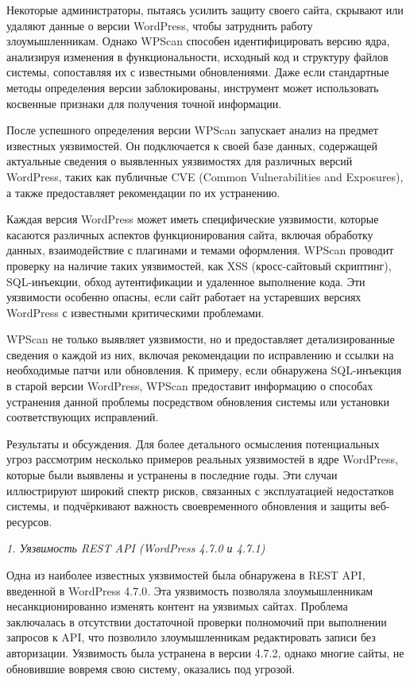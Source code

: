 \begin{multicols}{2}
Некоторые администраторы, пытаясь усилить защиту своего сайта, скрывают
или удаляют данные о версии WordPress, чтобы затруднить работу
злоумышленникам. Однако WPScan способен идентифицировать версию ядра,
анализируя изменения в функциональности, исходный код и структуру файлов
системы, сопоставляя их с известными обновлениями. Даже если стандартные
методы определения версии заблокированы, инструмент может использовать
косвенные признаки для получения точной информации.

После успешного определения версии WPScan запускает анализ на предмет
известных уязвимостей. Он подключается к своей базе данных, содержащей
актуальные сведения о выявленных уязвимостях для различных версий
WordPress, таких как публичные CVE (Common Vulnerabilities and
Exposures), а также предоставляет рекомендации по их устранению.

Каждая версия WordPress может иметь специфические уязвимости, которые
касаются различных аспектов функционирования сайта, включая обработку
данных, взаимодействие с плагинами и темами оформления. WPScan проводит
проверку на наличие таких уязвимостей, как XSS (кросс-сайтовый
скриптинг), SQL-инъекции, обход аутентификации и удаленное выполнение
кода. Эти уязвимости особенно опасны, если сайт работает на устаревших
версиях WordPress с известными критическими проблемами.

WPScan не только выявляет уязвимости, но и предоставляет
детализированные сведения о каждой из них, включая рекомендации по
исправлению и ссылки на необходимые патчи или обновления. К примеру,
если обнаружена SQL-инъекция в старой версии WordPress, WPScan
предоставит информацию о способах устранения данной проблемы посредством
обновления системы или установки соответствующих исправлений.

Результаты и обсуждения. Для более детального осмысления потенциальных
угроз рассмотрим несколько примеров реальных уязвимостей в ядре
WordPress, которые были выявлены и устранены в последние годы. Эти
случаи иллюстрируют широкий спектр рисков, связанных с эксплуатацией
недостатков системы, и подчёркивают важность своевременного обновления и
защиты веб-ресурсов.

\emph{1. Уязвимость REST API (WordPress 4.7.0 и 4.7.1)}

Одна из наиболее известных уязвимостей была обнаружена в REST API,
введенной в WordPress 4.7.0. Эта уязвимость позволяла злоумышленникам
несанкционированно изменять контент на уязвимых сайтах. Проблема
заключалась в отсутствии достаточной проверки полномочий при выполнении
запросов к API, что позволило злоумышленникам редактировать записи без
авторизации. Уязвимость была устранена в версии 4.7.2, однако многие
сайты, не обновившие вовремя свою систему, оказались под угрозой.


\end{multicols}
